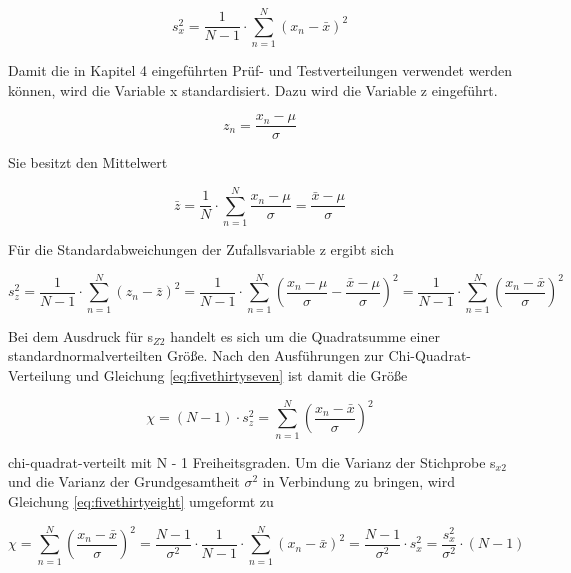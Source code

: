 \begin{equation}\label{eq:fivethirtyfour}
s_{x}^{2} =\dfrac{1}{N-1} \cdot \sum _{n=1}^{N}\left(x_{n} -\bar{x}\right)^{2}
\end{equation}

\noindent Damit die in Kapitel 4 eingef\"{u}hrten Pr\"{u}f- und Testverteilungen verwendet werden k\"{o}nnen, wird die Variable x standardisiert. Dazu wird die Variable z eingef\"{u}hrt. 

\begin{equation}\label{eq:fivethirtyfive}
z_{n} =\dfrac{x_{n} -\mu }{\sigma }
\end{equation}

\noindent Sie besitzt den Mittelwert

\begin{equation}\label{eq:fivethirtysix}
\bar{z}=\dfrac{1}{N} \cdot \sum _{n=1}^{N}\dfrac{x_{n} -\mu }{\sigma}  =\dfrac{\bar{x}-\mu }{\sigma}
\end{equation}

\noindent F\"{u}r die Standardabweichungen der Zufallsvariable z ergibt sich 

\begin{equation}\label{eq:fivethirtyseven}
s_{z}^{2} =\dfrac{1}{N-1} \cdot \sum _{n=1}^{N}\left(z_{n} -\bar{z}\right)^{2}  =\dfrac{1}{N-1} \cdot \sum _{n=1}^{N}\left(\dfrac{x_{n} -\mu }{\sigma } -\dfrac{\bar{x}-\mu }{\sigma } \right)^{2}  =\dfrac{1}{N-1} \cdot \sum _{n=1}^{N}\left(\dfrac{x_{n} -\bar{x}}{\sigma } \right)^{2}
\end{equation}

Bei dem Ausdruck f\"{u}r s$_{Z2}$ handelt es sich um die Quadratsumme einer standardnormalverteilten Gr\"{o}{\ss}e. Nach den Ausf\"{u}hrungen zur Chi-Quadrat-Verteilung und Gleichung \eqref{eq:fivethirtyseven} ist damit die Gr\"{o}{\ss}e

\begin{equation}\label{eq:fivethirtyeight}
\chi =\left(N-1\right)\cdot s_{z}^{2} =\sum _{n=1}^{N}\left(\dfrac{x_{n} -\bar{x}}{\sigma } \right)^{2}
\end{equation}

chi-quadrat-verteilt mit N - 1 Freiheitsgraden. Um die Varianz der Stichprobe s$_{x2}$ und die Varianz der Grundgesamtheit $\sigma^{2}$ in Verbindung zu bringen, wird Gleichung \eqref{eq:fivethirtyeight} umgeformt zu

\begin{equation}\label{eq:fivethirtynine}
\chi =\sum _{n=1}^{N}\left(\dfrac{x_{n} -\bar{x}}{\sigma } \right)^{2}  =\dfrac{N-1}{\sigma ^{2} } \cdot \dfrac{1}{N-1} \cdot \sum _{n=1}^{N}\left(x_{n} -\bar{x}\right)^{2}  =\dfrac{N-1}{\sigma ^{2} } \cdot s_{x}^{2} =\dfrac{s_{x}^{2} }{\sigma ^{2} } \cdot (N-1)
\end{equation}


